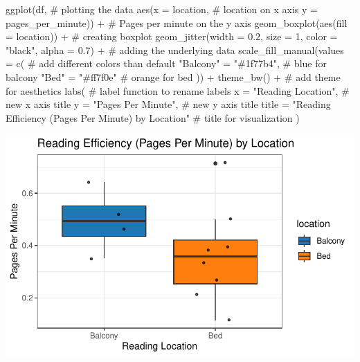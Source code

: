 \documentclass[
  letterpaper,
  DIV=11,
  numbers=noendperiod]{scrartcl}
\newenvironment{Shaded}{\begin{snugshade}}{\end{snugshade}}
\newcommand{\AttributeTok}[1]{\textcolor[rgb]{0.40,0.45,0.13}{#1}}
\newcommand{\CommentTok}[1]{\textcolor[rgb]{0.37,0.37,0.37}{#1}}
\newcommand{\DecValTok}[1]{\textcolor[rgb]{0.68,0.00,0.00}{#1}}
\newcommand{\FloatTok}[1]{\textcolor[rgb]{0.68,0.00,0.00}{#1}}
\newcommand{\FunctionTok}[1]{\textcolor[rgb]{0.28,0.35,0.67}{#1}}
\newcommand{\NormalTok}[1]{\textcolor[rgb]{0.00,0.23,0.31}{#1}}
\newcommand{\OtherTok}[1]{\textcolor[rgb]{0.00,0.23,0.31}{#1}}
\newcommand{\SpecialCharTok}[1]{\textcolor[rgb]{0.37,0.37,0.37}{#1}}
\newcommand{\StringTok}[1]{\textcolor[rgb]{0.13,0.47,0.30}{#1}}
\begin{document}
\begin{Shaded}
\begin{Highlighting}[]
\FunctionTok{ggplot}\NormalTok{(df, }\CommentTok{\# plotting the data}
       \FunctionTok{aes}\NormalTok{(}\AttributeTok{x =}\NormalTok{ location, }\CommentTok{\# location on x axis}
               \AttributeTok{y =}\NormalTok{ pages\_per\_minute)) }\SpecialCharTok{+} \CommentTok{\# Pages per minute on the y axis}
         \FunctionTok{geom\_boxplot}\NormalTok{(}\FunctionTok{aes}\NormalTok{(}\AttributeTok{fill =}\NormalTok{ location)) }\SpecialCharTok{+} \CommentTok{\# creating boxplot}
  \FunctionTok{geom\_jitter}\NormalTok{(}\AttributeTok{width =} \FloatTok{0.2}\NormalTok{, }\AttributeTok{size =} \DecValTok{1}\NormalTok{, }\AttributeTok{color =} \StringTok{"black"}\NormalTok{, }\AttributeTok{alpha =} \FloatTok{0.7}\NormalTok{) }\SpecialCharTok{+} \CommentTok{\# adding the underlying data}
  \FunctionTok{scale\_fill\_manual}\NormalTok{(}\AttributeTok{values =} \FunctionTok{c}\NormalTok{( }\CommentTok{\# add different colors than default}
    \StringTok{"Balcony"} \OtherTok{=} \StringTok{"\#1f77b4"}\NormalTok{, }\CommentTok{\# blue for balcony}
    \StringTok{"Bed"} \OtherTok{=} \StringTok{"\#ff7f0e"} \CommentTok{\# orange for bed}
\NormalTok{  )) }\SpecialCharTok{+}
  \FunctionTok{theme\_bw}\NormalTok{() }\SpecialCharTok{+} \CommentTok{\# add theme for aesthetics}
  \FunctionTok{labs}\NormalTok{( }\CommentTok{\# label function to rename labels}
    \AttributeTok{x =} \StringTok{"Reading Location"}\NormalTok{, }\CommentTok{\# new x axis title}
    \AttributeTok{y =} \StringTok{"Pages Per Minute"}\NormalTok{, }\CommentTok{\# new y axis title}
    \AttributeTok{title =} \StringTok{"Reading Efficiency (Pages Per Minute) by Location"} \CommentTok{\# title for visualization}
\NormalTok{  )}
\end{Highlighting}
\end{Shaded}

\includegraphics{Untitled_files/figure-pdf/unnamed-chunk-2-1.pdf}
\end{document}
